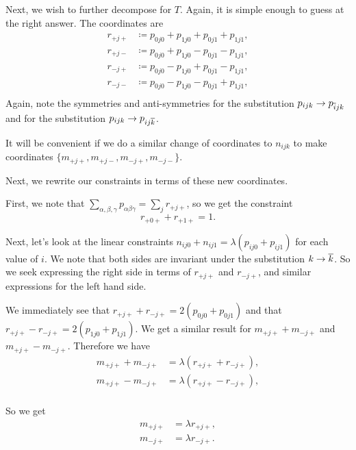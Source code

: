Next, we wish to further decompose for \(T\). Again, it is simple enough to guess at the right answer. The 
coordinates are
\begin{align}
r_{+j+} & \coloneqq p_{0j0} + p_{1j0} + p_{0j1} + p_{1j1}, \\
r_{+j-} & \coloneqq p_{0j0} + p_{1j0} - p_{0j1} - p_{1j1}, \\
r_{-j+} & \coloneqq p_{0j0} - p_{1j0} + p_{0j1} - p_{1j1}, \\
r_{-j-} & \coloneqq p_{0j0} - p_{1j0} - p_{0j1} + p_{1j1}, \\
\end{align}
Again, note the symmetries and anti-symmetries for the substitution \(p_{ijk} \to p_{\overline{i}jk}\) and for the
substitution \(p_{ijk} \to p_{ij\overline{k}}\).

It will be convenient if we do a similar change of coordinates to \(n_{ijk}\) to make coordinates 
\(\{m_{+j+}, m_{+j-}, m_{-j+}, m_{-j-}\}\).

Next, we rewrite our constraints in terms of these new coordinates.

First, we note that \(\sum_{\alpha, \beta, \gamma} p_{\alpha\beta\gamma} = \sum_j r_{+j+}\), so we get 
the constraint
\begin{equation}
r_{+0+} + r_{+1+} = 1.
\end{equation}

Next, let's look at the linear constraints \(n_{ij0} + n_{ij1} = \lambda (p_{ij0} + p_{ij1})\) for each 
value of \(i\). We note
that both sides are invariant under the substitution \(k \to \overline{k}\). So we seek expressing the right side
in terms of \(r_{+j+}\) and \(r_{-j+}\), and similar expressions for the left hand side.

We immediately see that \(r_{+j+} + r_{-j+} = 2(p_{0j0} + p_{0j1})\) and 
that \(r_{+j+} - r_{-j+} = 2(p_{1j0} + p_{1j1})\). We get a similar result for
\(m_{+j+} + m_{-j+}\) and \(m_{+j+} - m_{-j+}\). Therefore we have
\begin{align}
m_{+j+} + m_{-j+} & = \lambda(r_{+j+} + r_{-j+}), \\
m_{+j+} - m_{-j+} & = \lambda(r_{+j+} - r_{-j+}), \\
\end{align}

So we get
\begin{align}
m_{+j+} & = \lambda r_{+j+}, \\
m_{-j+} & = \lambda r_{-j+}.
\end{align}

